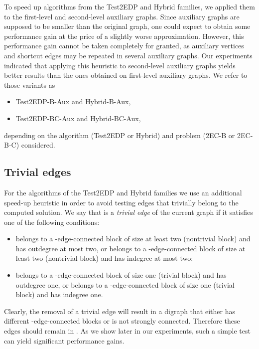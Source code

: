 \documentclass[11pt]{article}
\begin{document}
To speed up algorithms from the \textsf{Test2EDP} and
\textsf{Hybrid} families, we applied them
 to the first-level and second-level auxiliary graphs. Since auxiliary graphs are supposed to be smaller than the original graph, one could expect to obtain some performance gain at the price of a slightly worse approximation.
However, this performance gain cannot be taken completely for granted, as auxiliary vertices and shortcut edges may be repeated in several auxiliary graphs.
Our experiments indicated that applying this heuristic to second-level auxiliary graphs yields better results than the ones obtained on first-level auxiliary graphs.
We refer to those variants as
\begin{itemize}
\item \textsf{Test2EDP-B-Aux} and \textsf{Hybrid-B-Aux},
\item \textsf{Test2EDP-BC-Aux} and \textsf{Hybrid-BC-Aux},
\end{itemize}
depending on the algorithm (\textsf{Test2EDP} or \textsf{Hybrid}) and problem (\textsf{2EC-B} or \textsf{2EC-B-C}) considered.


\subsection{Trivial edges}
\label{sec:add-speed-up}

For the algorithms of the \textsf{Test2EDP} and \textsf{Hybrid} families
we use an additional speed-up heuristic in order to avoid testing edges that trivially
belong to the computed solution. We say that  is a  \emph{trivial edge} of the current graph  if
it satisfies one of the following conditions:
\begin{itemize}
\item  belongs to a -edge-connected block of size at least two (nontrivial block) and has outdegree at most two,
    or  belongs to a -edge-connected block of size at least two (nontrivial block) and has indegree at most two;
\item  belongs to a -edge-connected block of size one (trivial block) and has outdegree one,
    or  belongs to a -edge-connected block of size one (trivial block) and has indegree one.
\end{itemize}
Clearly, the removal of a trivial edge will result in a digraph that either has different -edge-connected blocks
or is not strongly connected.
Therefore these edges should remain in .
As we show later in our experiments, such a simple test can yield significant performance gains.
\end{document}
